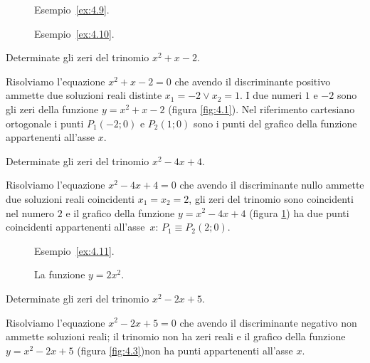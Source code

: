 \begin{figure}[b]
 \begin{minipage}[t]{.45\textwidth}
\centering
 
\caption{Esempio~\ref{ex:4.9}.}\label{fig:4.1}
 \end{minipage}\hfil
 \begin{minipage}[t]{.45\textwidth}
\centering
 
\caption{Esempio~\ref{ex:4.10}.}\label{fig:4.2}
 \end{minipage}
\end{figure}

\begin{exrig}
\begin{esempio}
\label{ex:4.9}
Determinate gli zeri del trinomio $x^2+x-2$.

Risolviamo l’equazione $x^2+x-2=0$ che avendo il discriminante positivo ammette due soluzioni reali distinte $x_1=-2\vee x_2=1$. I due numeri $1$ e $-2$ sono gli zeri della funzione $y=x^2+x-2$ (figura \ref{fig:4.1}). Nel riferimento cartesiano ortogonale i punti $P_1(-2;0)$ e $P_2(1;0)$ sono i punti del grafico della funzione appartenenti all’asse $x$.
\end{esempio}

\begin{esempio}
\label{ex:4.10}
Determinate gli zeri del trinomio $x^2-4x+4$.

Risolviamo l’equazione $x^2-4x+4=0$ che avendo il discriminante nullo ammette due soluzioni reali coincidenti $x_1=x_2=2$, gli zeri del trinomio sono coincidenti nel numero $ 2 $ e il grafico della funzione $y=x^2-4x+4$  (figura \ref{fig:4.2}) ha due punti coincidenti appartenenti all’asse~$ x $: $P_1\equiv P_2(2;0)$.
\end{esempio}
\newpage
\begin{figure}[b]
 \begin{minipage}[t]{.45\textwidth}
\centering
 
\caption{Esempio~\ref{ex:4.11}.}\label{fig:4.3}
 \end{minipage}\hfil
 \begin{minipage}[t]{.45\textwidth}
\centering
 
\caption{La funzione $y=2x^2$.}\label{fig:4.4}
 \end{minipage}
\end{figure}

\begin{esempio}
\label{ex:4.11}
Determinate gli zeri del trinomio $x^2-2x+5$.

Risolviamo l’equazione $x^2-2x+5=0$ che avendo il discriminante negativo non ammette soluzioni reali; il trinomio non ha zeri reali e il grafico della funzione $y=x^2-2x+5$ (figura \ref{fig:4.3})non ha punti appartenenti all’asse $x$.
\end{esempio}
\end{exrig}

